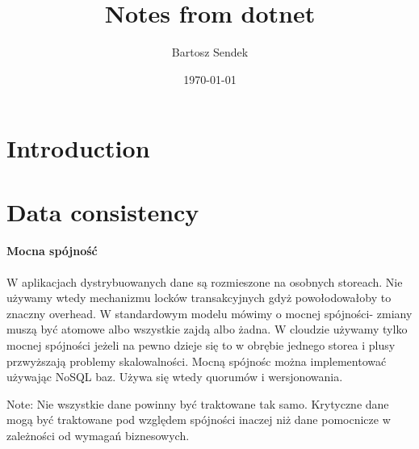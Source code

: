 \documentclass{article}
\title{Notes from dotnet}
\author{Bartosz Sendek}
\date{\today}
\begin{document}
\maketitle

\section{Introduction}
\section{Data consistency}
\paragraph{Mocna spójność}
W aplikacjach dystrybuowanych dane są rozmieszone na osobnych storeach. Nie używamy wtedy mechanizmu locków transakcyjnych gdyż 
powołodowałoby to znaczny overhead. W standardowym modelu mówimy o mocnej spójności- zmiany muszą być atomowe albo wszystkie zajdą albo żadna.
 W cloudzie używamy tylko mocnej spójności jeżeli na pewno dzieje się to w obrębie jednego storea i plusy przwyższają problemy skalowalności.
Mocną spójnośc można implementować używając NoSQL baz. Używa się wtedy quorumów i wersjonowania.

Note:
Nie wszystkie dane powinny być traktowane tak samo. Krytyczne dane mogą być traktowane pod względem spójności inaczej niż dane 
pomocnicze w zależności od wymagań biznesowych.
\end{document}
